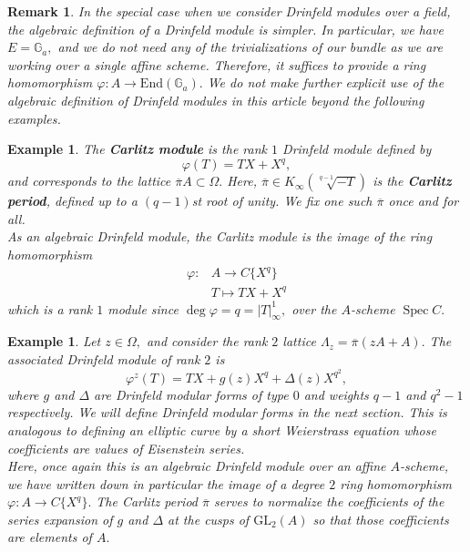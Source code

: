 \documentclass[11pt]{amsart}
\newtheorem{example}[theorem]{Example}
\newtheorem{remark}[theorem]{Remark}
\theoremstyle{definition}
\numberwithin{equation}{section}
\newcommand{\GL}{\mathrm{GL}} 	%
\newcommand{\End}{\mathrm{End}} 	%
\newcommand{\Spec}{\operatorname{Spec}} 	%
\newcommand{\bbG}{\mathbb{G}}		%
\begin{document}
		\begin{remark}
			In the special case when we consider Drinfeld modules over a field, the algebraic definition of a Drinfeld module is simpler. In particular, we have $E=\bbG_a,$ and we do not need any of the trivializations of our bundle as we are working over a single affine scheme. Therefore, it suffices to provide a ring homomorphism $\varphi: A\to \End(\bbG_a).$ We do not make further explicit use of the algebraic definition of Drinfeld modules in this article beyond the following examples.
		\end{remark}
		
		\begin{example}\cite{Carlitz-class-of-poly}\label{ex: Carlitz module}
			The \textbf{Carlitz module} is the rank $1$ Drinfeld module defined by \[\varphi(T)=TX+X^q,\] and corresponds to the lattice $\overline{\pi}A\subset \Omega.$ Here, $\overline{\pi}\in K_{\infty}(\sqrt[q-1]{-T})$ is the \textbf{Carlitz period}, defined up to a $(q-1)$st root of unity. We fix one such $\overline{\pi}$ once and for all.\\
			
			As an algebraic Drinfeld module, the Carlitz module is the image of the ring homomorphism \begin{align*}
				\varphi: &A\to C\{X^q\}\\
				&T\mapsto TX+X^q 
			\end{align*}
			which is a rank $1$ module since $\deg \varphi=q=|T|_{\infty}^1,$ over the $A$-scheme $\Spec C.$ 
		\end{example}
		
		\begin{example}
			Let $z\in \Omega,$ and consider the rank $2$ lattice $\Lambda_z=\overline{\pi}(zA+A).$ The associated Drinfeld module of rank $2$ is 
			\[\varphi^z(T)=TX+g(z)X^q+\Delta(z)X^{q^2},\]
			where $g$ and $\Delta$ are Drinfeld modular forms of type $0$ and weights $q-1$ and $q^2-1$ respectively. We will define Drinfeld modular forms in the next section. This is analogous to defining an elliptic curve by a short Weierstrass equation whose coefficients are values of Eisenstein series.\\
			
			Here, once again this is an algebraic Drinfeld module over an affine $A$-scheme, we have written down in particular the image of a degree $2$ ring homomorphism $\varphi: A\to C\{X^q\}.$ The Carlitz period $\overline{\pi}$ serves to normalize the coefficients of the series expansion of $g$ and $\Delta$ at the cusps of $\GL_2(A)$ so that those coefficients are elements of $A.$
		\end{example}
		
\end{document}
